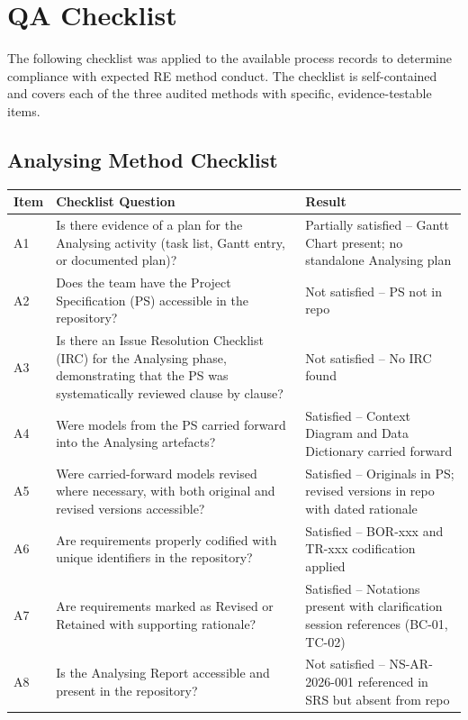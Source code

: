 \documentclass[11pt,a4paper]{article}
\begin{document}

\section{QA Checklist}

The following checklist was applied to the available process records to determine compliance with expected RE method conduct. The checklist is self-contained and covers each of the three audited methods with specific, evidence-testable items.

\subsection{Analysing Method Checklist}

\begin{longtable}{|p{}|p{}|p{}|}
\hline
\rowcolor{tableheader}
\textbf{Item} & \textbf{Checklist Question} & \textbf{Result} \\
\hline
\endhead

A1 & Is there evidence of a plan for the Analysing activity (task list, Gantt entry, or documented plan)? & Partially satisfied -- Gantt Chart present; no standalone Analysing plan \\
\hline
A2 & Does the team have the Project Specification (PS) accessible in the repository? & Not satisfied -- PS not in repo \\
\hline
A3 & Is there an Issue Resolution Checklist (IRC) for the Analysing phase, demonstrating that the PS was systematically reviewed clause by clause? & Not satisfied -- No IRC found \\
\hline
A4 & Were models from the PS carried forward into the Analysing artefacts? & Satisfied -- Context Diagram and Data Dictionary carried forward \\
\hline
A5 & Were carried-forward models revised where necessary, with both original and revised versions accessible? & Satisfied -- Originals in PS; revised versions in repo with dated rationale \\
\hline
A6 & Are requirements properly codified with unique identifiers in the repository? & Satisfied -- BOR-xxx and TR-xxx codification applied \\
\hline
A7 & Are requirements marked as Revised or Retained with supporting rationale? & Satisfied -- Notations present with clarification session references (BC-01, TC-02) \\
\hline
A8 & Is the Analysing Report accessible and present in the repository? & Not satisfied -- NS-AR-2026-001 referenced in SRS but absent from repo \\
\hline
\end{longtable}
\end{document}
